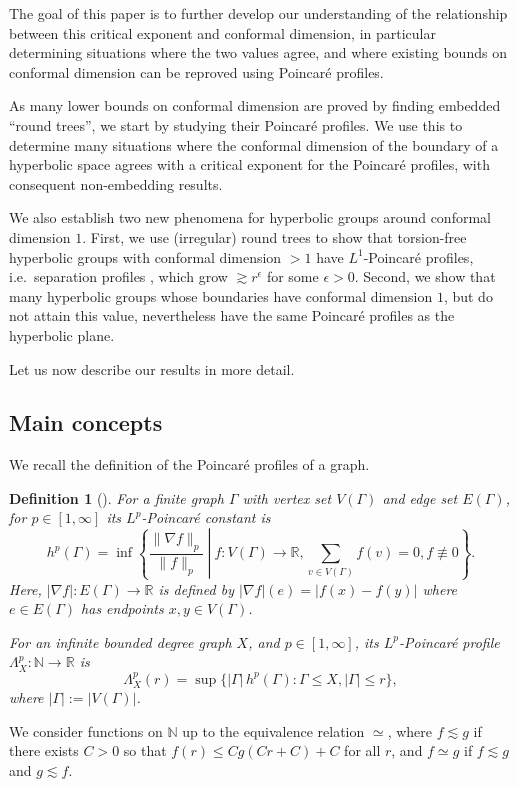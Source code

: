 \documentclass[11pt]{amsart}
\numberwithin{equation}{section}
\newtheorem{definition}[equation]{Definition}
\theoremstyle{citing}
\newcommand{\R}{\mathbb{R}}
\newcommand{\N}{\mathbb{N}}
\numberwithin{equation}{section}
\begin{document}
The goal of this paper is to further develop our understanding of the relationship between this critical exponent and conformal dimension, in particular determining situations where the two values agree, and where existing bounds on conformal dimension can be reproved using Poincar\'e profiles.

As many lower bounds on conformal dimension are proved by finding embedded ``round trees'', we start by studying their Poincar\'e profiles. We use this to determine many situations where the conformal dimension of the boundary of a hyperbolic space agrees with a critical exponent for the Poincar\'e profiles, with consequent non-embedding results.

We also establish two new phenomena for hyperbolic groups around conformal dimension $1$.  First, we use (irregular) round trees to show that torsion-free hyperbolic groups with conformal dimension $>1$ have $L^1$-Poin\-ca\-r\'e profiles, i.e.\ separation profiles \cite{BenSchTim-12-separation-graphs}, which grow $\gtrsim r^{\epsilon}$ for some $\epsilon>0$.
Second, we show that many hyperbolic groups whose boundaries have conformal dimension $1$, but do not attain this value, nevertheless have the same Poincar\'e profiles as the hyperbolic plane.


Let us now describe our results in more detail.
\subsection{Main concepts}
We recall the definition of the Poincar\'e profiles of a graph.
\begin{definition}[{\cite[\S 1.1]{HumeMackTess-Pprof}}]
	\label{def:poinc-profile}
	For a finite graph $\Gamma$ with vertex set $V(\Gamma)$ and edge set $E(\Gamma)$, for $p \in [1,\infty]$ its \emph{$L^p$-Poincar\'e constant} is
	\[
		h^p(\Gamma) = \inf \left\{\left. \frac{\|\nabla f\|_p}{\|f\|_p} \ \right|\ f:V(\Gamma) \to \R, \sum_{v \in V(\Gamma)} f(v)=0, f \not\equiv 0\right\}.
	\]
	Here, $|\nabla f|:E(\Gamma)\to \R$ is defined by $|\nabla f|(e) = |f(x)-f(y)|$ where $e \in E(\Gamma)$ has endpoints $x,y \in V(\Gamma)$.

	For an infinite bounded degree graph $X$, and $p \in [1,\infty]$, its \emph{$L^p$-Poincar\'e profile} $\Lambda_X^p:\N\to\R$ is
	\[
		\Lambda_X^p(r) = \sup\{|\Gamma|\, h^p(\Gamma) : \Gamma\leq X, |\Gamma|\leq r\},
	\]
	where $|\Gamma|:=|V(\Gamma)|$. 
\end{definition}

We consider functions on $\N$ up to the equivalence relation $\simeq$, where $f \lesssim g$ if there exists $C>0$ so that $f(r) \leq Cg(Cr+C)+C$ for all $r$, and $f \simeq g$ if $f \lesssim g$ and $g \lesssim f$.
\end{document}

